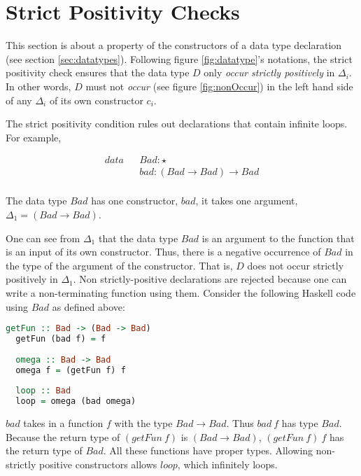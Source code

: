 \section{Strict Positivity Checks}
\label{sec:spos}

This section is about a property of the constructors of a data type declaration (see section \ref{sec:datatypes}). Following figure \ref{fig:datatype}'s notations, the strict positivity check ensures that the data type $D$ only \emph{occur strictly positively} in $\Delta_i$. In other words, $D$ must not \emph{occur} (see figure \ref{fig:nonOccur}) in the left hand side of any $\Delta_i$ of its own constructor $c_i$.

The strict positivity condition rules out declarations that contain infinite loops. For example,

\begin{equation*}
  \begin{aligned}
    data &  & Bad : \star                 \\
         &  & bad : (Bad \to Bad) \to Bad \\
  \end{aligned}
\end{equation*}

The data type $Bad$ has one constructor, $bad$, it takes one argument, $\Delta_1 = (Bad \to Bad)$.

One can see from $\Delta_1$ that the data type $Bad$ is an argument to the function that is an input of its own constructor. Thus, there is a negative occurrence of $Bad$ in the type of the argument of the constructor. That is, $D$ does not occur strictly positively in $\Delta_1$. Non strictly-positive declarations are rejected because one can write a non-terminating function using them. Consider the following Haskell code using $Bad$ as defined above:

\begin{lstlisting}[language=haskell]
  getFun :: Bad -> (Bad -> Bad)
  getFun (bad f) = f
  
  omega :: Bad -> Bad
  omega f = (getFun f) f
  
  loop :: Bad
  loop = omega (bad omega)
\end{lstlisting}

$bad$ takes in a function $f$ with the type $Bad \to Bad$. Thus $bad \: f$ has type $Bad$. Because the return type of $(getFun \: f)$ is $(Bad \to Bad)$, $(getFun \: f) \: f$ has the return type of $Bad$. All these functions have proper types. Allowing non-strictly positive constructors allows $loop$, which infinitely loops.

